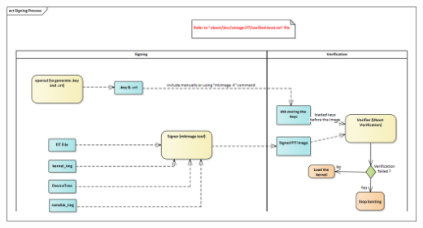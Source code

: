\documentclass{article}
\begin{document}
\begin{center}
    \includegraphics[scale=0.40]{./resources/img/Signing Process.png}
\end{center}
\end{document}
